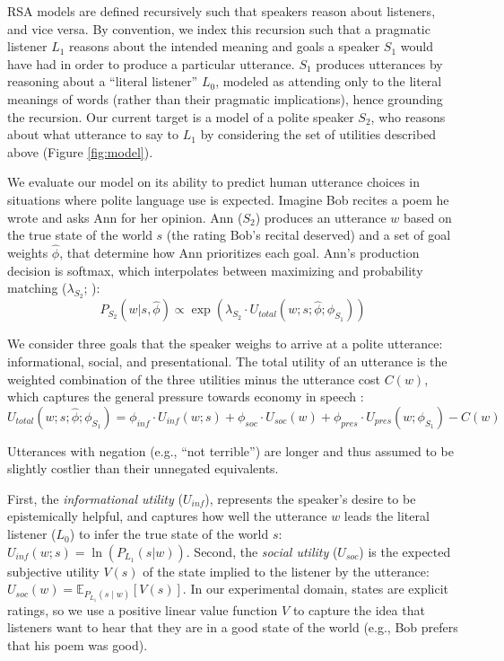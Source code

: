 \documentclass[12pt]{article}
\begin{document}
RSA models are defined recursively such that speakers reason about
listeners, and vice versa. By convention, we index this recursion such that a pragmatic listener \(L_1\) reasons about the intended meaning
and goals a speaker \(S_1\) would have had in order to produce a particular
utterance.
\(S_1\) produces utterances by reasoning about a \enquote{literal listener} \(L_0\), modeled as attending only to the literal meanings of words
(rather than their pragmatic implications), hence grounding the
recursion.
Our current target is a model of a polite speaker
\(S_2\), who reasons about what utterance to say to \(L_1\) by
considering the set of utilities described above (Figure
\ref{fig:model}).

We evaluate our model on its ability to predict human utterance choices in situations where polite language use is expected. Imagine Bob recites a poem he wrote and asks Ann for her opinion.
Ann (\(S_2\)) produces an utterance \(w\) based on the true state of the world \(s\) (the rating Bob's recital deserved) and a set of goal weights
\(\hat{\phi}\), that determine how Ann prioritizes each goal.
Ann's production decision is softmax, which interpolates between
maximizing and probability matching (\(\lambda_{S_2}\); \cite{goodman2013}):
\[P_{S_2}(w | s, \hat{\phi}) \propto \exp(\lambda_{S_2} \cdot U_{total}(w; s; \hat{\phi}; \phi_{S_{1}}))\]

We consider three goals that the speaker weighs to arrive at a polite utterance: informational, social, and presentational.
The total utility of an utterance is the weighted combination of the three
utilities minus the utterance cost \(C(w)\), which captures the general pressure towards economy in speech \cite{goodman2015}:
\[U_{total}(w; s; \hat{\phi}; \phi_{S_{1}}) = \phi_{inf} \cdot U_{inf}(w; s) + \phi_{soc} \cdot U_{soc}(w) + \phi_{pres} \cdot U_{pres}(w; \phi_{S_{1}}) - C(w)\]

\noindent Utterances with negation (e.g., \enquote{not terrible}) are longer and thus assumed to be slightly costlier than their unnegated equivalents.

First, the \emph{informational utility}
(\(U_{inf}\)), represents the speaker's desire to be epistemically
helpful, and captures how well the utterance $w$ leads the literal listener (\(L_0\)) to infer the true state of the world $s$:
\(U_{inf}(w; s) = \ln(P_{L_1}(s | w))\).
Second, the \emph{social utility} (\(U_{soc}\)) is the expected subjective utility
\(V(s)\) of the state implied to the listener by the utterance:
\(U_{soc}(w) = \mathbb{E}_{P_{L_1}(s \mid w)}[V(s)]\).
In our experimental domain, states are explicit ratings, so we use a positive linear value function $V$ to capture the idea that listeners want to hear that they are in a good state of the world (e.g., Bob prefers that his poem was good).
\end{document}
